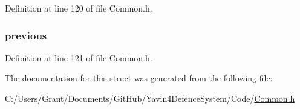 Definition at line 120 of file Common.\+h.

\hypertarget{structsystem_state_af2f2716b4afa23c8b53a9351a0924b6b}{
\subsubsection[{previous}]{ previous}}\label{structsystem_state_af2f2716b4afa23c8b53a9351a0924b6b}


Definition at line 121 of file Common.\+h.



The documentation for this struct was generated from the following file\+:\begin{DoxyCompactItemize}
\item 
C\+:/\+Users/\+Grant/\+Documents/\+Git\+Hub/\+Yavin4\+Defence\+System/\+Code/\hyperlink{_common_8h}{Common.\+h}\end{DoxyCompactItemize}
